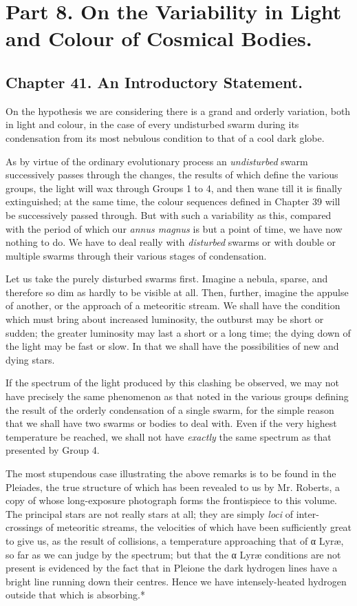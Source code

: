 \documentclass[a4paper, 12pt, oneside, polutonikogreek, english]{article}
\begin{document}
\section{Part 8. On the Variability in Light and Colour of Cosmical Bodies.}

\subsection{Chapter 41. An Introductory Statement.}

On the hypothesis we are considering there is a grand and orderly variation, both in light and colour, in the case of every undisturbed swarm during its condensation from its most nebulous condition to that of a cool dark globe.

As by virtue of the ordinary evolutionary process an \emph{undisturbed} swarm successively passes through the changes, the results of which define the various groups, the light will wax through Groups 1 to 4, and then wane till it is finally extinguished; at the same time, the colour sequences defined in Chapter 39 will be successively passed through. But with such a variability as this, compared with the period of which our \emph{annus magnus} is but a point of time, we have now nothing to do. We have to deal really with \emph{disturbed} swarms or with double or multiple swarms through their various stages of condensation.

Let us take the purely disturbed swarms first. Imagine a nebula, sparse, and therefore so dim as hardly to be visible at all. Then, further, imagine the appulse of another, or the approach of a meteoritic stream. We shall have the condition which must bring about increased luminosity, the outburst may be short or sudden; the greater luminosity may last a short or a long time; the dying down of the light may be fast or slow. In that we shall have the possibilities of new and dying stars.

If the spectrum of the light produced by this clashing be observed, we may not have precisely the same phenomenon as that noted in the various groups defining the result of the orderly condensation of a single swarm, for the simple reason that we shall have two swarms or bodies to deal with. Even if the very highest temperature be reached, we shall not have \emph{exactly} the same spectrum as that presented by Group 4.

The most stupendous case illustrating the above remarks is to be found in the Pleiades, the true structure of which has been revealed to us by Mr. Roberts, a copy of whose long-exposure photograph forms the frontispiece to this volume. The principal stars are not really stars at all; they are simply \emph{loci} of inter-crossings of meteoritic streams, the velocities of which have been sufficiently great to give us, as the result of collisions, a temperature approaching that of α Lyræ, so far as we can judge by the spectrum; but that the α Lyræ conditions are not present is evidenced by the fact that in Pleione the dark hydrogen lines have a bright line running down their centres. Hence we have intensely-heated hydrogen outside that which is absorbing.*
\end{document}
